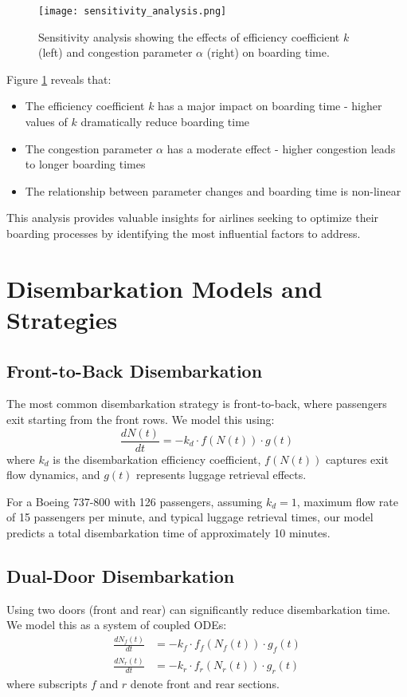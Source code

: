 \documentclass[12pt,a4paper]{article}
\begin{document}
\begin{figure}[H]
\centering
\texttt{[image: sensitivity\_analysis.png]}
\caption{Sensitivity analysis showing the effects of efficiency coefficient $k$ (left) and congestion parameter $\alpha$ (right) on boarding time.}
\label{fig:sensitivity}
\end{figure}

Figure \ref{fig:sensitivity} reveals that:
\begin{itemize}
    \item The efficiency coefficient $k$ has a major impact on boarding time - higher values of $k$ dramatically reduce boarding time
    \item The congestion parameter $\alpha$ has a moderate effect - higher congestion leads to longer boarding times
    \item The relationship between parameter changes and boarding time is non-linear
\end{itemize}

This analysis provides valuable insights for airlines seeking to optimize their boarding processes by identifying the most influential factors to address.

\section{Disembarkation Models and Strategies}

\subsection{Front-to-Back Disembarkation}
The most common disembarkation strategy is front-to-back, where passengers exit starting from the front rows. We model this using:
\begin{equation}
\frac{dN(t)}{dt} = -k_d \cdot f(N(t)) \cdot g(t)
\label{eq:disembarkation}
\end{equation}
where $k_d$ is the disembarkation efficiency coefficient, $f(N(t))$ captures exit flow dynamics, and $g(t)$ represents luggage retrieval effects.

For a Boeing 737-800 with 126 passengers, assuming $k_d = 1$, maximum flow rate of 15 passengers per minute, and typical luggage retrieval times, our model predicts a total disembarkation time of approximately 10 minutes.

\subsection{Dual-Door Disembarkation}
Using two doors (front and rear) can significantly reduce disembarkation time. We model this as a system of coupled ODEs:
\begin{align}
\frac{dN_f(t)}{dt} &= -k_f \cdot f_f(N_f(t)) \cdot g_f(t) \\
\frac{dN_r(t)}{dt} &= -k_r \cdot f_r(N_r(t)) \cdot g_r(t)
\label{eq:dual_door}
\end{align}
where subscripts $f$ and $r$ denote front and rear sections.
\end{document}

